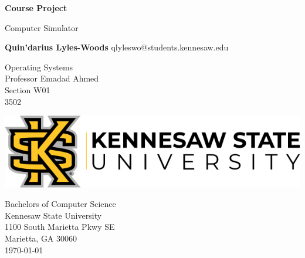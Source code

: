 \begin{titlepage}
\begin{center}
	\vspace*{1cm}

	\Huge
	\textbf{Course Project}

	\vspace{0.5cm}
	\LARGE
	Computer Simulator

	\vspace{1.5cm}

	\textbf{Quin'darius Lyles-Woods}
	\Large
	qlyleswo@students.kennesaw.edu

	\vfill
	\LARGE
	Operating Systems			\\
	Professor Emadad Ahmed			\\
	Section W01 				\\
	3502
	\vspace{0.8cm}

	\includegraphics[width=\textwidth]{kennesawlogo}

	\vspace{0.8cm}

	\Large
	Bachelors of Computer Science\\
	Kennesaw State University\\
	1100 South Marietta Pkwy SE\\
	Marietta, GA 30060\\
	\today

	\vspace{1cm}

\end{center}
\end{titlepage}
